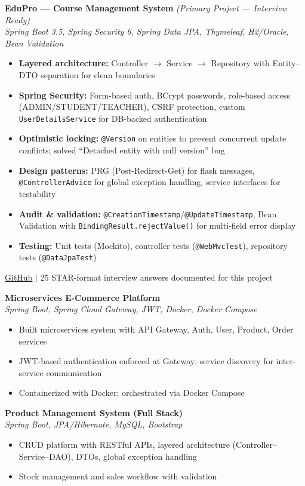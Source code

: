 \documentclass[10pt, letterpaper]{article}
\begin{document}
\textbf{EduPro --- Course Management System} \textit{(Primary Project --- Interview Ready)}\\
\small\textit{Spring Boot 3.5, Spring Security 6, Spring Data JPA, Thymeleaf, H2/Oracle, Bean Validation}
\begin{itemize}
    \item \textbf{Layered architecture:} Controller $\rightarrow$ Service $\rightarrow$ Repository with Entity--DTO separation for clean boundaries
    \item \textbf{Spring Security:} Form-based auth, BCrypt passwords, role-based access (ADMIN/STUDENT/TEACHER), CSRF protection, custom \texttt{UserDetailsService} for DB-backed authentication
    \item \textbf{Optimistic locking:} \texttt{@Version} on entities to prevent concurrent update conflicts; solved ``Detached entity with null version'' bug
    \item \textbf{Design patterns:} PRG (Post-Redirect-Get) for flash messages, \texttt{@ControllerAdvice} for global exception handling, service interfaces for testability
    \item \textbf{Audit \& validation:} \texttt{@CreationTimestamp}/\texttt{@UpdateTimestamp}, Bean Validation with \texttt{BindingResult.rejectValue()} for multi-field error display
    \item \textbf{Testing:} Unit tests (Mockito), controller tests (\texttt{@WebMvcTest}), repository tests (\texttt{@DataJpaTest})
\end{itemize}
\small \href{https://github.com/xyz}{GitHub} $|$ 25 STAR-format interview answers documented for this project

\vspace{4pt}
\textbf{Microservices E-Commerce Platform}\\
\small\textit{Spring Boot, Spring Cloud Gateway, JWT, Docker, Docker Compose}
\begin{itemize}
    \item Built microservices system with API Gateway, Auth, User, Product, Order services
    \item JWT-based authentication enforced at Gateway; service discovery for inter-service communication
    \item Containerized with Docker; orchestrated via Docker Compose
\end{itemize}

\vspace{2pt}
\textbf{Product Management System (Full Stack)}\\
\small\textit{Spring Boot, JPA/Hibernate, MySQL, Bootstrap}
\begin{itemize}
    \item CRUD platform with RESTful APIs, layered architecture (Controller--Service--DAO), DTOs, global exception handling
    \item Stock management and sales workflow with validation
\end{itemize}
\end{document}
